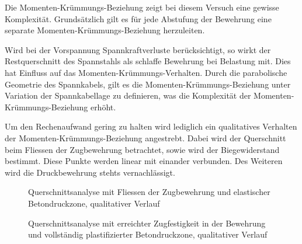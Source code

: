 \documentclass[
  11pt,
  letterpaper,
]{scrreprt}
\begin{document}
Die Momenten-Krümmungs-Beziehung zeigt bei diesem Versuch eine gewisse
Komplexität. Grundsätzlich gilt es für jede Abstufung der Bewehrung eine
separate Momenten-Krümmungs-Beziehung herzuleiten.

Wird bei der Vorspannung Spannkraftverluste berücksichtigt, so wirkt der
Restquerschnitt des Spannstahls als schlaffe Bewehrung bei Belastung
mit. Dies hat Einfluss auf das Momenten-Krümmungs-Verhalten. Durch die
parabolische Geometrie des Spannkabels, gilt es die
Momenten-Krümmungs-Beziehung unter Variation der Spannkabellage zu
definieren, was die Komplexität der Momenten-Krümmungs-Beziehung erhöht.

Um den Rechenaufwand gering zu halten wird lediglich ein qualitatives
Verhalten der Momenten-Krümmungs-Beziehung angestrebt. Dabei wird der
Querschnitt beim Fliessen der Zugbewehrung betrachtet, sowie wird der
Biegewiderstand bestimmt. Diese Punkte werden linear mit einander
verbunden. Des Weiteren wird die Druckbewehrung stehts vernachlässigt.

\begin{figure}[H]


\caption{\label{fig-qs_fliessen_qualitativ}Querschnittsanalyse mit
Fliessen der Zugbewehrung und elastischer Betondruckzone, qualitativer
Verlauf}

\end{figure}%

\begin{figure}[H]


\caption{\label{fig-qs_widerstand_qualitativ}Querschnittsanalyse mit
erreichter Zugfestigkeit in der Bewehrung und vollständig
plastifizierter Betondruckzone, qualitativer Verlauf}

\end{figure}%
\end{document}
